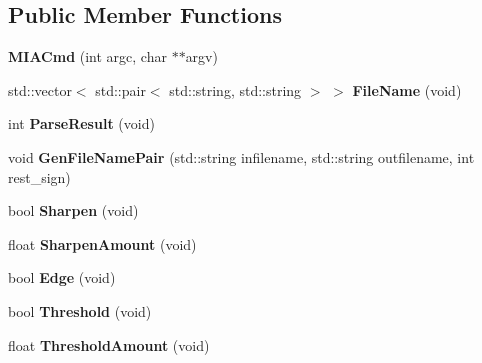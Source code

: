 \subsection*{Public Member Functions}
\begin{DoxyCompactItemize}
\item 
{\bfseries M\+I\+A\+Cmd} (int argc, char $\ast$$\ast$argv)\hypertarget{classimage__tools_1_1MIACmd_ac42849230f79ff44da340a5ab7603e0c}{}\label{classimage__tools_1_1MIACmd_ac42849230f79ff44da340a5ab7603e0c}

\item 
std\+::vector$<$ std\+::pair$<$ std\+::string, std\+::string $>$ $>$ {\bfseries File\+Name} (void)\hypertarget{classimage__tools_1_1MIACmd_a4ea875beab7e734e44f17f20417aa208}{}\label{classimage__tools_1_1MIACmd_a4ea875beab7e734e44f17f20417aa208}

\item 
int {\bfseries Parse\+Result} (void)\hypertarget{classimage__tools_1_1MIACmd_ac04c12f3c78ebe1f12b526abd8e49a18}{}\label{classimage__tools_1_1MIACmd_ac04c12f3c78ebe1f12b526abd8e49a18}

\item 
void {\bfseries Gen\+File\+Name\+Pair} (std\+::string infilename, std\+::string outfilename, int rest\+\_\+sign)\hypertarget{classimage__tools_1_1MIACmd_ae6ef14bc676f4e167c99ad000c378ebf}{}\label{classimage__tools_1_1MIACmd_ae6ef14bc676f4e167c99ad000c378ebf}

\item 
bool {\bfseries Sharpen} (void)\hypertarget{classimage__tools_1_1MIACmd_ab1568ba4b722e37636042cd3437f6819}{}\label{classimage__tools_1_1MIACmd_ab1568ba4b722e37636042cd3437f6819}

\item 
float {\bfseries Sharpen\+Amount} (void)\hypertarget{classimage__tools_1_1MIACmd_abb3571ac2f7305776054b6d9bf36f76e}{}\label{classimage__tools_1_1MIACmd_abb3571ac2f7305776054b6d9bf36f76e}

\item 
bool {\bfseries Edge} (void)\hypertarget{classimage__tools_1_1MIACmd_ace1ce3a63d52a62c840c80e49be3d61e}{}\label{classimage__tools_1_1MIACmd_ace1ce3a63d52a62c840c80e49be3d61e}

\item 
bool {\bfseries Threshold} (void)\hypertarget{classimage__tools_1_1MIACmd_a4665df9a3d2225f30b2c93eec50c6978}{}\label{classimage__tools_1_1MIACmd_a4665df9a3d2225f30b2c93eec50c6978}

\item 
float {\bfseries Threshold\+Amount} (void)\hypertarget{classimage__tools_1_1MIACmd_a75281360be1520497f3b6b87dbf810ee}{}\label{classimage__tools_1_1MIACmd_a75281360be1520497f3b6b87dbf810ee}


\end{DoxyCompactItemize}
